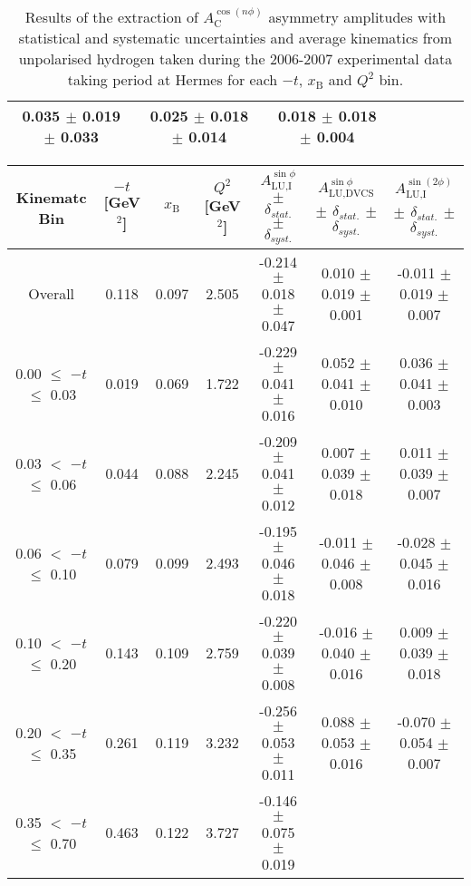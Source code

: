 \begin{table}[width=15cm]
\begin{center}
{\begin{tabular}{|c|c|c|c|c|c|c|c|}
0.035  $\pm$  0.019  $\pm$  0.033 & 0.025 $\pm$   0.018  $\pm$  0.014 & 0.018   $\pm$  0.018   $\pm$   0.004\\
\hline
  \end{tabular}
}
 \end{center}
\caption{Results of the extraction of $A_{\textrm{C}}^{\cos(n\phi)}$ asymmetry amplitudes with statistical and systematic uncertainties and average kinematics from unpolarised hydrogen taken during
the 2006-2007 experimental data taking period at H{\sc ermes} for each $-t$, $x_{\textrm{B}}$ and $Q^{2}$ bin.}
\end{table}


\begin{table}[width=15cm]
 \begin{center}
\resizebox{16cm}{!} {
  \begin{tabular}{|c|c|c|c|c|c|c|}
\hline
Kinematc Bin &  $-t$ [GeV$^{2}$] & $x_{\textrm{B}}$ & $Q^{2}$ [GeV$^{2}$] & 
$A_{\textrm{LU,I}}^{\sin\phi}$ $\pm$ $\delta_{stat.}$ $\pm$ $\delta_{syst.}$ & $A_{\textrm{LU,DVCS}}^{\sin\phi}$ $\pm$ $\delta_{stat.}$ $\pm$ $\delta_{syst.}$
& $A_{\textrm{LU,I}}^{\sin(2\phi)}$ $\pm$ $\delta_{stat.}$ $\pm$ $\delta_{syst.}$ \\
\hline
\hline
Overall &  0.118 & 0.097 &  2.505 &  -0.214  $\pm$  0.018  $\pm$   0.047 &
 0.010  $\pm$  0.019  $\pm$  0.001 & -0.011  $\pm$  0.019  $\pm$   0.007 \\
\hline
0.00 $\leqslant$ $-t$ $\leqslant$ 0.03 &  0.019 & 0.069 &  1.722 &  -0.229  $\pm$  0.041 $\pm$   0.016 &
 0.052  $\pm$  0.041   $\pm$  0.010 & 0.036  $\pm$  0.041  $\pm$   0.003\\
0.03 $<$ $-t$ $\leqslant$ 0.06 &  0.044 & 0.088 &  2.245 &  -0.209 $\pm$   0.041   $\pm$  0.012 &
 0.007 $\pm$   0.039  $\pm$   0.018 & 0.011  $\pm$  0.039  $\pm$   0.007\\
0.06 $<$ $-t$ $\leqslant$ 0.10 &  0.079 & 0.099 &  2.493 & -0.195 $\pm$   0.046   $\pm$  0.018 &
 -0.011  $\pm$  0.046  $\pm$   0.008 & -0.028  $\pm$  0.045   $\pm$  0.016 \\
0.10 $<$ $-t$ $\leqslant$ 0.20 &  0.143 & 0.109 &  2.759 &  -0.220 $\pm$   0.039  $\pm$   0.008 &
-0.016  $\pm$  0.040  $\pm$   0.016 & 0.009  $\pm$  0.039  $\pm$  0.018\\
0.20 $<$ $-t$ $\leqslant$ 0.35 &  0.261 & 0.119 &  3.232 &  -0.256 $\pm$   0.053  $\pm$   0.011 &
0.088  $\pm$  0.053  $\pm$   0.016 & -0.070 $\pm$   0.054   $\pm$  0.007\\
0.35 $<$ $-t$ $\leqslant$ 0.70 &  0.463 & 0.122 &  3.727 &  -0.146  $\pm$  0.075  $\pm$   0.019 & 

\end{tabular}}
\end{center}
\end{table}
